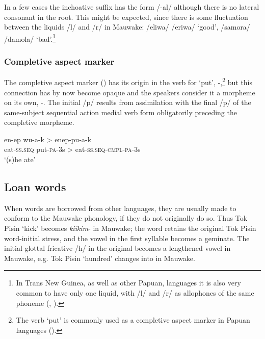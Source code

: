 In a few cases the inchoative suffix has the form /-al/ although there is no lateral consonant in the root.  This might be expected, since there is some fluctuation between the liquids /l/ and /r/ in Mauwake: /eliwa/ {\Tilde} /eriwa/ `good', /samora/ {\Tilde} /damola/ `bad'.\footnote{In Trans New Guinea, as well as other Papuan, languages it is also very common to have only one liquid, with /l/ and /r/ as allophones of the same phoneme (\citealt[55]{Wurm1982}, \citealt[55]{Foley1986}).} 


\subsubsection{Completive aspect marker}

The completive aspect marker () has its origin in the verb for `put', \nobreakdash-,\footnote{The verb `put' is commonly used as a completive aspect marker in Papuan languages ().} but this connection has by now become opaque and the speakers consider it a morpheme on its own, -.  The initial /p/ results from assimilation with the final /p/ of the same-subject sequential action medial verb form obligatorily preceding the completive morpheme.

\ea
\gll en-ep  wu-a-k  {\upshape \textgreater}  enep-pu-a-k \\ 
eat-\textsc{ss}.\textsc{seq}  put-\textsc{pa}-3s  {{\textgreater}}  eat-\textsc{ss}.\textsc{seq}-\textsc{cmpl}-\textsc{pa}-3s\\
\glt `(s)he ate'
\z

\subsection{Loan words}

When words are borrowed from other languages, they are usually made to conform to the Mauwake phonology, if they do not originally do so.  Thus Tok Pisin  `kick' becomes \textit{kiikim}- in Mauwake; the word retains the original Tok Pisin word-initial stress, and the vowel in the first syllable becomes a geminate.  The initial glottal fricative /h/ in the original becomes a lengthened vowel in Mauwake, e.g. Tok Pisin  `hundred' changes into   in Mauwake.


